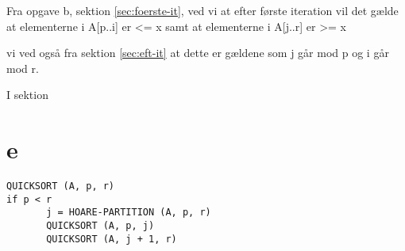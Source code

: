 \documentclass[10pt,a4paper,danish]{article}
\begin{document}
Fra opgave b, sektion \ref{sec:foerste-it}, ved vi at efter første iteration vil det gælde at elementerne i A[p..i] er <= x samt at elementerne i A[j..r]
er >= x

vi ved også fra sektion \ref{sec:eft-it} at dette er gældene som j går mod p og i går mod r.

I sektion 


\section{e}
\begin{verbatim}
QUICKSORT (A, p, r)
if p < r
       j = HOARE-PARTITION (A, p, r)
       QUICKSORT (A, p, j)
       QUICKSORT (A, j + 1, r)
\end{verbatim}
\end{document}
